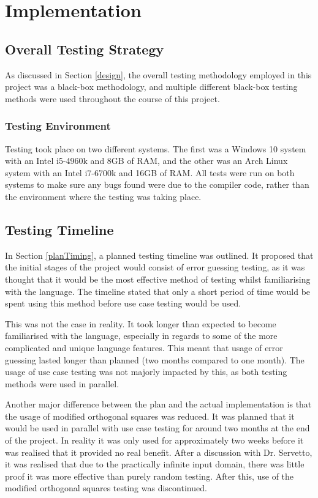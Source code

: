  \chapter{Implementation}\label{C:impl}

\section{Overall Testing Strategy}

As discussed in Section \ref{design}, the overall testing methodology employed in this project was a black-box methodology, and multiple different black-box testing methods were used throughout the course of this project.

\subsection{Testing Environment}

Testing took place on two different systems. The first was a Windows 10 system with an Intel i5-4960k and 8GB of RAM, and the other was an Arch Linux system with an Intel i7-6700k and 16GB of RAM. All tests were run on both systems to make sure any bugs found were due to the compiler code, rather than the environment where the testing was taking place. 

\section{Testing Timeline}

In Section \ref{planTiming}, a planned testing timeline was outlined. It proposed that the initial stages of the project would consist of error guessing testing, as it was thought that it would be the most effective method of testing whilst familiarising with the language. The timeline stated that only a short period of time would be spent using this method before use case testing would be used. 

This was not the case in reality. It took longer than expected to become familiarised with the language, especially in regards to some of the more complicated and unique language features. This meant that usage of error guessing lasted longer than planned (two months compared to one month). The usage of use case testing was not majorly impacted by this, as both testing methods were used in parallel.

Another major difference between the plan and the actual implementation is that the usage of modified orthogonal squares was reduced. It was planned that it would be used in parallel with use case testing for around two months at the end of the project. In reality it was only used for approximately two weeks before it was realised that it provided no real benefit. After a discussion with Dr. Servetto, it was realised that due to the practically infinite input domain, there was little proof it was more effective than purely random testing. After this, use of the modified orthogonal squares testing was discontinued.

